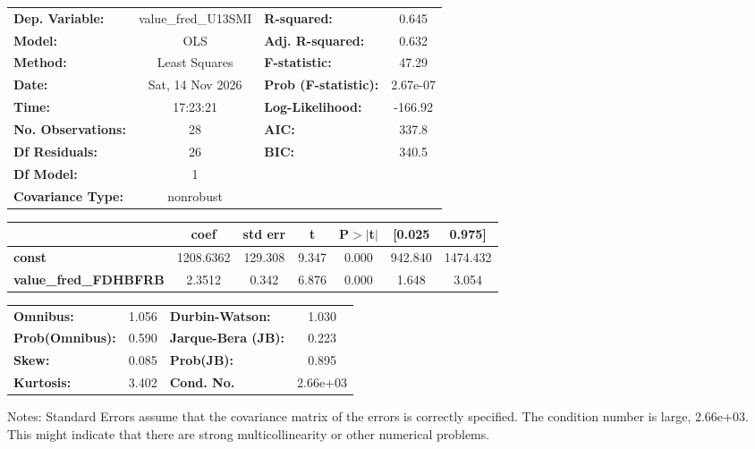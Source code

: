 \begin{center}
\begin{tabular}{lclc}
\toprule
\textbf{Dep. Variable:}       & value\_fred\_U13SMI & \textbf{  R-squared:         } &     0.645   \\
\textbf{Model:}               &         OLS         & \textbf{  Adj. R-squared:    } &     0.632   \\
\textbf{Method:}              &    Least Squares    & \textbf{  F-statistic:       } &     47.29   \\
\textbf{Date:}                &   Sat, 14 Nov 2026  & \textbf{  Prob (F-statistic):} &  2.67e-07   \\
\textbf{Time:}                &       17:23:21      & \textbf{  Log-Likelihood:    } &   -166.92   \\
\textbf{No. Observations:}    &            28       & \textbf{  AIC:               } &     337.8   \\
\textbf{Df Residuals:}        &            26       & \textbf{  BIC:               } &     340.5   \\
\textbf{Df Model:}            &             1       & \textbf{                     } &             \\
\textbf{Covariance Type:}     &      nonrobust      & \textbf{                     } &             \\
\bottomrule
\end{tabular}
\begin{tabular}{lcccccc}
                              & \textbf{coef} & \textbf{std err} & \textbf{t} & \textbf{P$> |$t$|$} & \textbf{[0.025} & \textbf{0.975]}  \\
\midrule
\textbf{const}                &    1208.6362  &      129.308     &     9.347  &         0.000        &      942.840    &     1474.432     \\
\textbf{value\_fred\_FDHBFRB} &       2.3512  &        0.342     &     6.876  &         0.000        &        1.648    &        3.054     \\
\bottomrule
\end{tabular}
\begin{tabular}{lclc}
\textbf{Omnibus:}       &  1.056 & \textbf{  Durbin-Watson:     } &    1.030  \\
\textbf{Prob(Omnibus):} &  0.590 & \textbf{  Jarque-Bera (JB):  } &    0.223  \\
\textbf{Skew:}          &  0.085 & \textbf{  Prob(JB):          } &    0.895  \\
\textbf{Kurtosis:}      &  3.402 & \textbf{  Cond. No.          } & 2.66e+03  \\
\bottomrule
\end{tabular}
\end{center}

Notes: \newline
 [1] Standard Errors assume that the covariance matrix of the errors is correctly specified. \newline
 [2] The condition number is large, 2.66e+03. This might indicate that there are \newline
 strong multicollinearity or other numerical problems.